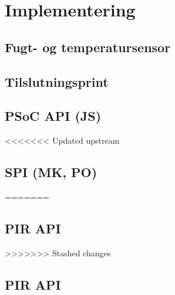 \chapter{Implementering}


\section{Fugt- og temperatursensor}


\section{Tilslutningsprint}


\section{PSoC API (JS)}


<<<<<<< Updated upstream
\section{SPI (MK, PO)}

=======
\section{PIR API}


>>>>>>> Stashed changes

\section{PIR API}



